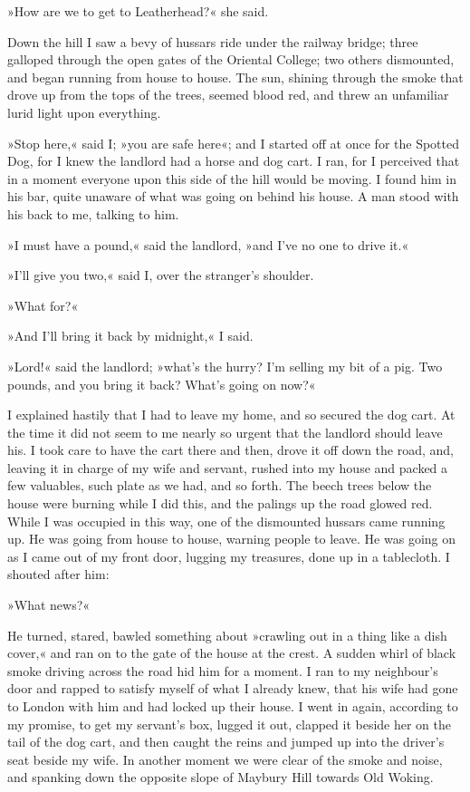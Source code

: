 »How are we to get to Leatherhead?« she said.

Down the hill I saw a bevy of hussars ride under the railway bridge; three galloped through the open gates of the Oriental College; two others dismounted, and began running from house to house. The sun, shining through the smoke that drove up from the tops of the trees, seemed blood red, and threw an unfamiliar lurid light upon everything.

»Stop here,« said I; »you are safe here«; and I started off at once for the Spotted Dog, for I knew the landlord had a horse and dog cart. I ran, for I perceived that in a moment everyone upon this side of the hill would be moving. I found him in his bar, quite unaware of what was going on behind his house. A man stood with his back to me, talking to him.

»I must have a pound,« said the landlord, »and I've no one to drive it.«

»I'll give you two,« said I, over the stranger's shoulder.

»What for?«

»And I'll bring it back by midnight,« I said.

»Lord!« said the landlord; »what's the hurry? I'm selling my bit of a pig. Two pounds, and you bring it back? What's going on now?«

I explained hastily that I had to leave my home, and so secured the dog cart. At the time it did not seem to me nearly so urgent that the landlord should leave his. I took care to have the cart there and then, drove it off down the road, and, leaving it in charge of my wife and servant, rushed into my house and packed a few valuables, such plate as we had, and so forth. The beech trees below the house were burning while I did this, and the palings up the road glowed red. While I was occupied in this way, one of the dismounted hussars came running up. He was going from house to house, warning people to leave. He was going on as I came out of my front door, lugging my treasures, done up in a tablecloth. I shouted after him:

»What news?«

He turned, stared, bawled something about »crawling out in a thing like a dish cover,« and ran on to the gate of the house at the crest. A sudden whirl of black smoke driving across the road hid him for a moment. I ran to my neighbour's door and rapped to satisfy myself of what I already knew, that his wife had gone to London with him and had locked up their house. I went in again, according to my promise, to get my servant's box, lugged it out, clapped it beside her on the tail of the dog cart, and then caught the reins and jumped up into the driver's seat beside my wife. In another moment we were clear of the smoke and noise, and spanking down the opposite slope of Maybury Hill towards Old Woking.

